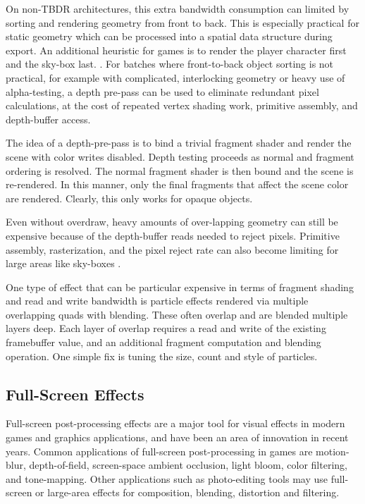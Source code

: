 On non-TBDR architectures, this extra bandwidth consumption can limited by
sorting and rendering geometry from front to back.  This is especially
practical for static geometry which can be processed into a spatial data
structure during export.  An additional heuristic for games is to render the
player character first and the sky-box last.  \cite{fast_mobile_shaders}.  For
batches where front-to-back object sorting is not practical, for example with
complicated, interlocking geometry or heavy use of alpha-testing, a depth
pre-pass can be used to eliminate redundant pixel calculations, at the cost of
repeated vertex shading work, primitive assembly, and depth-buffer access.

The idea of a depth-pre-pass is to bind a trivial fragment shader and render the scene with color writes disabled.  Depth testing proceeds as normal and fragment ordering is resolved.  The normal fragment shader is then bound and the scene is re-rendered.  In this manner, only the final fragments that affect the scene color are rendered.  Clearly, this only works for opaque objects.

Even without overdraw, heavy amounts of over-lapping geometry can still be expensive because of the depth-buffer reads needed to reject pixels.  Primitive assembly, rasterization, and the pixel reject rate can also become limiting for large areas like sky-boxes \cite{fast_mobile_shaders}.

One type of effect that can be particular expensive in terms of fragment
shading and read and write bandwidth is particle effects rendered via multiple
overlapping quads with blending.  These often overlap and are blended multiple
layers deep.  Each layer of overlap requires a read and write of the existing
framebuffer value, and an additional fragment computation and blending
operation.  One simple fix is tuning the size, count and style of particles.

\subsection {Full-Screen Effects}\label{Jon-McCaffrey-Full-Screen-Effects}
Full-screen post-processing effects are a major tool for visual effects in
modern games and graphics applications, and have been an area of innovation in
recent years.   Common applications of full-screen post-processing in games are
motion-blur, depth-of-field, screen-space ambient occlusion, light bloom, color
filtering, and tone-mapping.  Other applications such as photo-editing tools
may use full-screen or large-area effects for composition, blending, distortion
and filtering.

